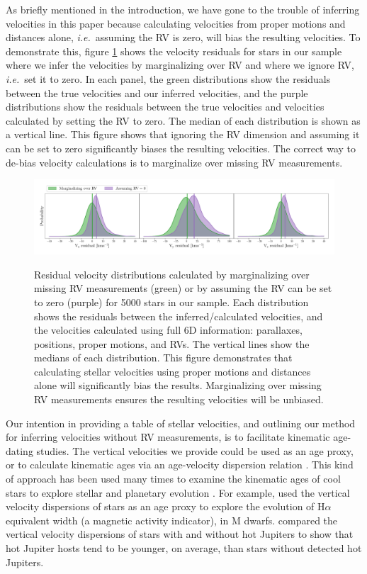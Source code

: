 \documentclass[]{aastex631}
\newcommand{\ie}{{\it i.e.}}
\newcommand{\eg}{{\it e.g.}}
\begin{document}
As briefly mentioned in the introduction, we have gone to the trouble of
inferring velocities in this paper because calculating velocities from proper
motions and distances alone, \ie\ assuming the RV is zero, will bias the
resulting velocities.
To demonstrate this, figure \ref{fig:inferred_vs_calc} shows the velocity
residuals for stars in our sample where we infer the velocities by
marginalizing over RV and where we ignore RV, \ie\ set it to zero.
In each panel, the green distributions show the residuals between the true
velocities and our inferred velocities, and the purple distributions show the
residuals between the true velocities and velocities calculated by setting the
RV to zero.
The median of each distribution is shown as a vertical line.
This figure shows that ignoring the RV dimension and assuming it can be set to
zero significantly biases the resulting velocities.
The correct way to de-bias velocity calculations is to marginalize over
missing RV measurements.
\begin{figure}[ht!]
\caption{
Residual velocity distributions calculated by marginalizing over missing RV
    measurements (green) or by assuming the RV can be set to zero (purple) for
    5000 stars in our sample.
Each distribution shows the residuals between the inferred/calculated
    velocities, and the velocities calculated using full 6D information:
    parallaxes, positions, proper motions, and RVs.
The vertical lines show the medians of each distribution.
This figure demonstrates that calculating stellar velocities using proper
    motions and distances alone will significantly bias the results.
Marginalizing over missing RV measurements ensures the resulting velocities
    will be unbiased.
}
  \centering
    \includegraphics[width=1\textwidth]{inferred_vs_calc}
\label{fig:inferred_vs_calc}
\end{figure}

Our intention in providing a table of stellar velocities, and outlining our
method for inferring velocities without RV measurements, is to facilitate
kinematic age-dating studies.
The vertical velocities we provide could be used as an age proxy, or to
calculate kinematic ages via an age-velocity dispersion relation
\citep[\eg][]{yu2018, mackereth2019, sharma2021}.
This kind of approach has been used many times to examine the kinematic ages
of cool stars to explore stellar and planetary evolution
\citep[\eg][]{newton2016, kiman2019, hamer2019, angus2020, lu2021}.
For example, \citet{kiman2019} used the vertical velocity dispersions of stars
as an age proxy to explore the evolution of H$\alpha$ equivalent width (a
magnetic activity indicator), in M dwarfs.
\citet{hamer2019} compared the vertical velocity dispersions of stars with and
without hot Jupiters to show that hot Jupiter hosts tend to be younger, on
average, than stars without detected hot Jupiters.
\end{document}
